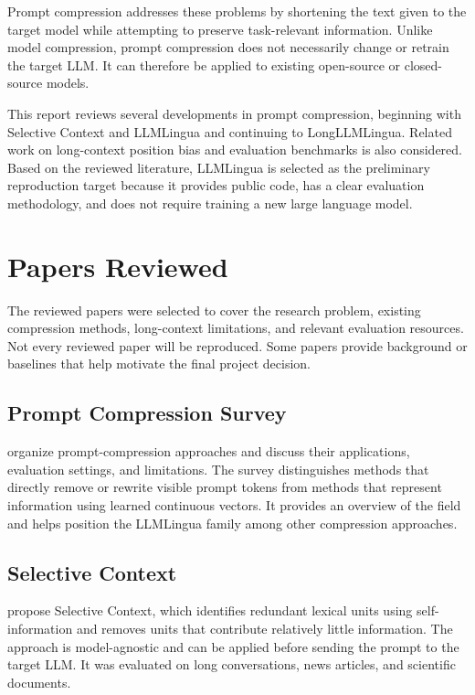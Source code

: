 \documentclass[10pt,a4paper,twocolumn]{article}
\begin{document}
Prompt compression addresses these problems by shortening the text given to the target model while attempting to preserve task-relevant information. Unlike model compression, prompt compression does not necessarily change or retrain the target LLM. It can therefore be applied to existing open-source or closed-source models.

This report reviews several developments in prompt compression, beginning with Selective Context and LLMLingua and continuing to LongLLMLingua. Related work on long-context position bias and evaluation benchmarks is also considered. Based on the reviewed literature, LLMLingua is selected as the preliminary reproduction target because it provides public code, has a clear evaluation methodology, and does not require training a new large language model.

\section{Papers Reviewed}

The reviewed papers were selected to cover the research problem, existing compression methods, long-context limitations, and relevant evaluation resources. Not every reviewed paper will be reproduced. Some papers provide background or baselines that help motivate the final project decision.

\subsection{Prompt Compression Survey}

\citet{li-etal-2025-prompt-survey} organize prompt-compression approaches and discuss their applications, evaluation settings, and limitations. The survey distinguishes methods that directly remove or rewrite visible prompt tokens from methods that represent information using learned continuous vectors. It provides an overview of the field and helps position the LLMLingua family among other compression approaches.

\subsection{Selective Context}

\citet{li-etal-2023-compressing} propose Selective Context, which identifies redundant lexical units using self-information and removes units that contribute relatively little information. The approach is model-agnostic and can be applied before sending the prompt to the target LLM. It was evaluated on long conversations, news articles, and scientific documents.
\end{document}
